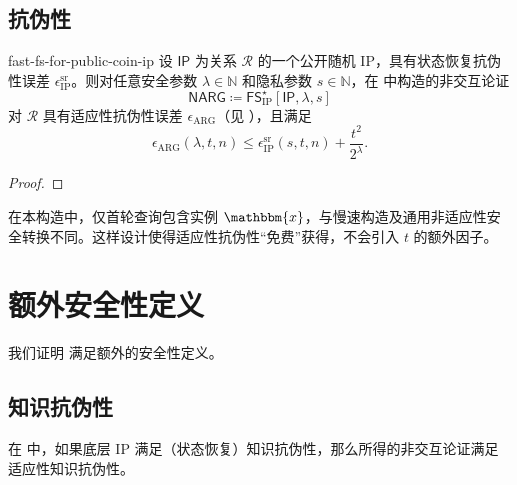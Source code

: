 \documentclass[american,singlepageview]{snargs-book-zh}
\newcommand{\DefineEqual}{\coloneqq}
\newcommand{\Naturals}{\mathbb{N}}
\newcommand{\Relation}{\mathcal{R}}
\newcommand{\Instance}{\mathbbm{x}}
\newcommand{\InstanceSize}{n}
\newcommand{\ProtoSoundnessError}{\epsilon}
\newcommand{\SRSuperscript}{\mathrm{sr}}
\newcommand{\ProtoSRSoundnessError}{\ProtoSoundnessError^{\SRSuperscript}}
\newcommand{\IPSymbol}{\mathsf{IP}}
\newcommand{\IPSubscript}{\scriptscriptstyle\mathrm{IP}}
\newcommand{\NARGSymbol}{\mathsf{NARG}}
\newcommand{\ARGSubscript}{\scriptscriptstyle\mathrm{ARG}}
\newcommand{\ARGSoundnessError}{\ProtoSoundnessError_{\ARGSubscript}}
\newcommand{\ROQueryBound}{t}
\newcommand{\SecurityParameter}{\lambda}
\newcommand{\PrivacyParameter}{s}
\newcommand{\FormatTransName}[1]{\bm{\mathsf{#1}}}
\newcommand{\FastFSonIPSymbol}{\FormatTransName{FS}_{\IPSubscript}^{\star}}
\newcommand{\FormatTransInputs}[3]{[#1,#2,#3]}
\newcommand{\FastFSonIPTransformation}[3]{\FastFSonIPSymbol\FormatTransInputs{#1}{#2}{#3}}
\newcommand{\IPSRSoundnessError}{\ProtoSRSoundnessError_{\IPSubscript}}
\newcommand{\FSErrorExpression}[1][\ROQueryBound]{\frac{#1^2}{2^{\SecurityParameter}}}
\newcommand{\FSIPSoundnessExpression}{\IPSRSoundnessError(\PrivacyParameter,\ROQueryBound,\InstanceSize)+\FSErrorExpression}
\begin{document}
\section{抗伪性}
\label{section:fast-fs-reduction}

\begin{ImportantTheorem}{}{fast-fs-for-public-coin-ip}
设 $\IPSymbol$ 为关系 $\Relation$ 的一个公开随机 IP，具有状态恢复抗伪性误差 $\IPSRSoundnessError$。则对任意安全参数 $\SecurityParameter\in\Naturals$ 和隐私参数 $\PrivacyParameter\in\Naturals$，在  中构造的非交互论证
\[
\NARGSymbol\DefineEqual\FastFSonIPTransformation{\IPSymbol}{\SecurityParameter}{\PrivacyParameter}
\]
对 $\Relation$ 具有适应性抗伪性误差 $\ARGSoundnessError$（见 ），且满足
\[
\ARGSoundnessError(\SecurityParameter,\ROQueryBound,\InstanceSize)
\le
\FSIPSoundnessExpression.
\]
\end{ImportantTheorem}

\begin{proof}
\end{proof}

\begin{remark}[关于适应性安全性]
\label{remark:adaptivity-in-fast-fs}
在本构造中，仅首轮查询包含实例 $\Instance$，与慢速构造及通用非适应性安全转换不同。这样设计使得适应性抗伪性“免费”获得，不会引入 $\ROQueryBound$ 的额外因子。
\end{remark}


\chapter{额外安全性定义}
\label{chapter:fs-additional}

我们证明  满足额外的安全性定义。

\section{知识抗伪性}
\label{section:fs-knowledge-soundness}

在  中，如果底层 IP 满足（状态恢复）知识抗伪性，那么所得的非交互论证满足适应性知识抗伪性。
\end{document}
